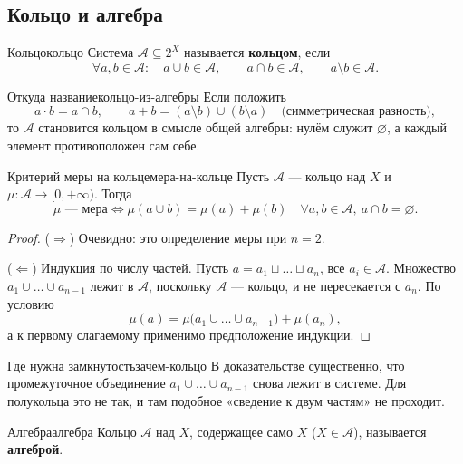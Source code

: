 \subsection{Кольцо и алгебра}

\begin{Definition}{Кольцо}{кольцо}
	Система $\mathcal{A} \subseteq 2^X$ называется \textbf{кольцом}, если
	\[
	\forall a,b \in \mathcal{A} \colon \quad
	a \cup b \in \mathcal{A}, \qquad
	a \cap b \in \mathcal{A}, \qquad
	a \setminus b \in \mathcal{A} .
	\]
\end{Definition}

\begin{Remark}{Откуда название}{кольцо-из-алгебры}
	Если положить
	\[
	a \cdot b = a \cap b, \qquad
	a + b = (a \setminus b) \cup (b \setminus a) \quad
	\text{(симметрическая разность)},
	\]
	то $\mathcal{A}$ становится кольцом в смысле общей алгебры: нулём служит
	$\varnothing$, а каждый элемент противоположен сам себе.
\end{Remark}

\begin{Lemma}{Критерий меры на кольце}{мера-на-кольце}
	Пусть $\mathcal{A}$ --- кольцо над $X$ и $\mu : \mathcal{A} \to [0,+\infty)$.
	Тогда
	\[
	\mu \text{ --- мера} \iff
	\mu(a \cup b) = \mu(a) + \mu(b) \quad
	\forall a,b \in \mathcal{A},\ a \cap b = \varnothing .
	\]
\end{Lemma}

\begin{proof}
	($\Rightarrow$) Очевидно: это определение меры при $n = 2$.

	($\Leftarrow$) Индукция по числу частей. Пусть
	$a = a_1 \sqcup \ldots \sqcup a_n$, все $a_i \in \mathcal{A}$. Множество
	$a_1 \cup \ldots \cup a_{n-1}$ лежит в $\mathcal{A}$, поскольку
	$\mathcal{A}$ --- кольцо, и не пересекается с $a_n$. По условию
	\[
	\mu(a) = \mu\bigl(a_1 \cup \ldots \cup a_{n-1}\bigr) + \mu(a_n),
	\]
	а к первому слагаемому применимо предположение индукции.
\end{proof}

\begin{Remark}{Где нужна замкнутость}{зачем-кольцо}
	В доказательстве существенно, что промежуточное объединение
	$a_1 \cup \ldots \cup a_{n-1}$ снова лежит в системе. Для полукольца
	это не так, и там подобное «сведение к двум частям» не проходит.
\end{Remark}

\begin{Definition}{Алгебра}{алгебра}
	Кольцо $\mathcal{A}$ над $X$, содержащее само $X$
	($X \in \mathcal{A}$), называется \textbf{алгеброй}.
\end{Definition}

